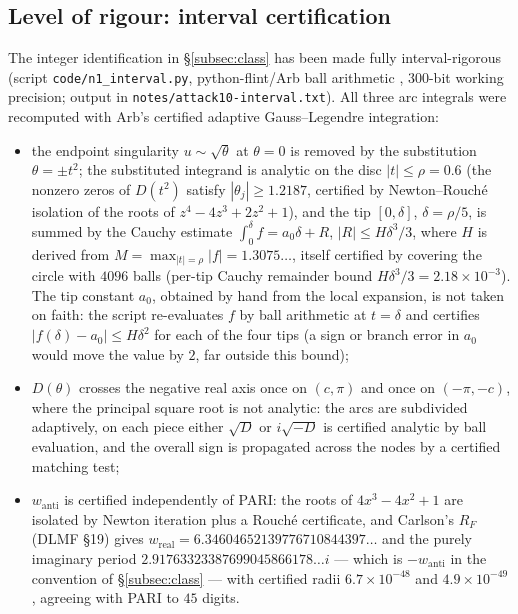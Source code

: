 \documentclass[preprint,12pt]{elsarticle}
\theoremstyle{definition}
\theoremstyle{remark}
\begin{document}
\subsection{Level of rigour: interval certification}
\label{subsec:rigour}

The integer identification in \S\ref{subsec:class} has been made fully
interval-rigorous (script \texttt{code/n1\_interval.py}, python-flint/Arb
ball arithmetic \cite{Arb}, $300$-bit working precision; output in
\texttt{notes/attack10-interval.txt}).  All three arc integrals were
recomputed with Arb's certified adaptive Gauss--Legendre integration:
\begin{itemize}
  \item the endpoint singularity $u\sim\sqrt{\theta}$ at $\theta=0$ is removed
  by the substitution $\theta=\pm t^{2}$; the substituted integrand is
  analytic on the disc $|t|\le\rho=0.6$ (the nonzero zeros of $D(t^{2})$
  satisfy $|\theta_{j}|\ge1.2187$, certified by Newton--Rouch\'e isolation of
  the roots of $z^{4}-4z^{3}+2z^{2}+1$), and the tip $[0,\delta]$, $\delta=\rho/5$,
  is summed by the Cauchy estimate $\int_{0}^{\delta}f=a_{0}\delta+R$,
  $|R|\le H\delta^{3}/3$, where $H$ is derived from
  $M=\max_{|t|=\rho}|f|=1.3075\ldots$, itself certified by covering the
  circle with $4096$ balls (per-tip Cauchy remainder bound
  $H\delta^{3}/3=2.18\times10^{-3}$). The tip constant $a_{0}$, obtained by
  hand from the local expansion, is not taken on faith: the script
  re-evaluates $f$ by ball arithmetic at $t=\delta$ and certifies
  $|f(\delta)-a_{0}|\le H\delta^{2}$ for each of the four tips (a sign or
  branch error in $a_{0}$ would move the value by $2$, far outside this
  bound);
  \item $D(\theta)$ crosses the negative real axis once on $(c,\pi)$ and once
  on $(-\pi,-c)$, where the principal square root is not analytic: the arcs
  are subdivided adaptively, on each piece either $\sqrt{D}$ or $i\sqrt{-D}$
  is certified analytic by ball evaluation, and the overall sign is
  propagated across the nodes by a certified matching test;
  \item $w_{\mathrm{anti}}$ is certified independently of PARI: the roots of
  $4x^{3}-4x^{2}+1$ are isolated by Newton iteration plus a Rouch\'e
  certificate, and Carlson's $R_{F}$ (DLMF \S19) gives
  $w_{\mathrm{real}}=6.34604652139776710844397\ldots$ and the purely
  imaginary period $2.91763323387699045866178\ldots i$ --- which is
  $-w_{\mathrm{anti}}$ in the convention of \S\ref{subsec:class} --- with
  certified radii $6.7\times10^{-48}$ and $4.9\times10^{-49}$, agreeing with
  PARI to $45$ digits.
\end{itemize}
\end{document}
